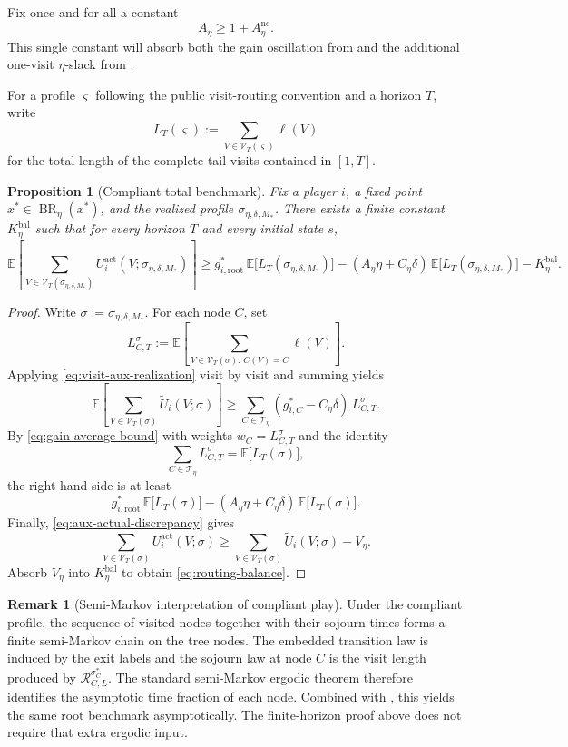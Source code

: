 \documentclass[12pt]{article}
\newtheorem{proposition}[theorem]{Proposition}
\theoremstyle{definition}
\newtheorem{remark}[theorem]{Remark}
\newcommand{\E}{\mathbb{E}}
\newcommand{\1}{\mathbf{1}}
\newcommand{\cT}{\mathcal{T}}
\DeclareMathOperator{\BR}{BR}
\begin{document}
Fix once and for all a constant
\[
A_\eta\ge 1+A_\eta^{\mathrm{nc}}.
\]
This single constant will absorb both the gain oscillation from
 and the additional one-visit $\eta$-slack from
.

For a profile $\varsigma$ following the public visit-routing convention and a
horizon $T$, write
\[
L_T(\varsigma):=\sum_{V\in\mathcal V_T(\varsigma)}\ell(V)
\]
for the total length of the complete tail visits contained in $[1,T]$.

\begin{proposition}[Compliant total benchmark]
\label{prop:routing-balance}
Fix a player $i$, a fixed point $x^*\in\BR_\eta(x^*)$, and the realized profile
$\sigma_{\eta,\delta,M_*}$. There exists a finite constant
$K_\eta^{\mathrm{bal}}$ such that for every horizon $T$ and every initial state
$s$,
\begin{equation}
\label{eq:routing-balance}
\E\left[
\sum_{V\in\mathcal V_T(\sigma_{\eta,\delta,M_*})}
U_i^{\mathrm{act}}(V;\sigma_{\eta,\delta,M_*})
\right]
\ge
g_{i,\mathrm{root}}^*\,
\E\bigl[L_T(\sigma_{\eta,\delta,M_*})\bigr]
-
(A_\eta\eta+C_\eta\delta)\,
\E\bigl[L_T(\sigma_{\eta,\delta,M_*})\bigr]
-
K_\eta^{\mathrm{bal}}.
\end{equation}
\end{proposition}

\begin{proof}
Write $\sigma:=\sigma_{\eta,\delta,M_*}$. For each node $C$, set
\[
L_{C,T}^\sigma
:=
\E\left[
\sum_{V\in\mathcal V_T(\sigma):\,C(V)=C}\ell(V)
\right].
\]
Applying \eqref{eq:visit-aux-realization} visit by visit and summing yields
\[
\E\left[
\sum_{V\in\mathcal V_T(\sigma)}
\widetilde U_i(V;\sigma)
\right]
\ge
\sum_{C\in\cT_\eta}
(g_{i,C}^*-C_\eta\delta)\,L_{C,T}^\sigma.
\]
By \eqref{eq:gain-average-bound} with weights $w_C=L_{C,T}^\sigma$ and the
identity
\[
\sum_{C\in\cT_\eta}L_{C,T}^\sigma=\E\bigl[L_T(\sigma)\bigr],
\]
the right-hand side is at least
\[
g_{i,\mathrm{root}}^*\,\E\bigl[L_T(\sigma)\bigr]
-
(A_\eta\eta+C_\eta\delta)\,\E\bigl[L_T(\sigma)\bigr].
\]
Finally, \eqref{eq:aux-actual-discrepancy} gives
\[
\sum_{V\in\mathcal V_T(\sigma)}
U_i^{\mathrm{act}}(V;\sigma)
\ge
\sum_{V\in\mathcal V_T(\sigma)}
\widetilde U_i(V;\sigma)-V_\eta.
\]
Absorb $V_\eta$ into $K_\eta^{\mathrm{bal}}$ to obtain
\eqref{eq:routing-balance}.
\end{proof}

\begin{remark}[Semi-Markov interpretation of compliant play]
Under the compliant profile, the sequence of visited nodes together with their
sojourn times forms a finite semi-Markov chain on the tree nodes. The embedded
transition law is induced by the exit labels and the sojourn law at node $C$ is
the visit length produced by $\mathcal R_{C,L}^{\sigma_C^*}$. The standard
semi-Markov ergodic theorem therefore identifies the asymptotic time fraction of
each node. Combined with , this yields the same
root benchmark asymptotically. The finite-horizon proof above does not require
that extra ergodic input.
\end{remark}
\end{document}
